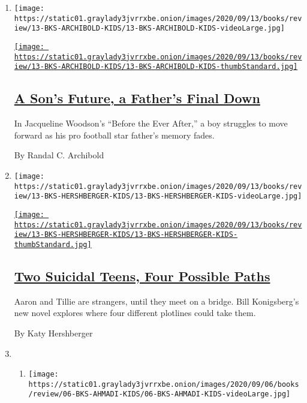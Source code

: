 \begin{enumerate}
\def\labelenumi{\arabic{enumi}.}
\item
  \texttt{[image: https://static01.graylady3jvrrxbe.onion/images/2020/09/13/books/review/13-BKS-ARCHIBOLD-KIDS/13-BKS-ARCHIBOLD-KIDS-videoLarge.jpg]}

  \href{/2020/09/05/books/review/jacqueline-woodson-before-the-ever-after.html}{\texttt{[image: https://static01.graylady3jvrrxbe.onion/images/2020/09/13/books/review/13-BKS-ARCHIBOLD-KIDS/13-BKS-ARCHIBOLD-KIDS-thumbStandard.jpg]}}

  \hypertarget{a-sons-future-a-fathers-final-down}{%
  \subsection{\texorpdfstring{\href{/2020/09/05/books/review/jacqueline-woodson-before-the-ever-after.html}{A
  Son's Future, a Father's Final
  Down}}{A Son's Future, a Father's Final Down}}\label{a-sons-future-a-fathers-final-down}}

  In Jacqueline Woodson's ``Before the Ever After,'' a boy struggles to
  move forward as his pro football star father's memory fades.

  By Randal C. Archibold
\item
  \texttt{[image: https://static01.graylady3jvrrxbe.onion/images/2020/09/13/books/review/13-BKS-HERSHBERGER-KIDS/13-BKS-HERSHBERGER-KIDS-videoLarge.jpg]}

  \href{/2020/09/05/books/review/bill-konigsberg-the-bridge.html}{\texttt{[image: https://static01.graylady3jvrrxbe.onion/images/2020/09/13/books/review/13-BKS-HERSHBERGER-KIDS/13-BKS-HERSHBERGER-KIDS-thumbStandard.jpg]}}

  \hypertarget{two-suicidal-teens-four-possible-paths}{%
  \subsection{\texorpdfstring{\href{/2020/09/05/books/review/bill-konigsberg-the-bridge.html}{Two
  Suicidal Teens, Four Possible
  Paths}}{Two Suicidal Teens, Four Possible Paths}}\label{two-suicidal-teens-four-possible-paths}}

  Aaron and Tillie are strangers, until they meet on a bridge. Bill
  Konigsberg's new novel explores where four different plotlines could
  take them.

  By Katy Hershberger
\item
  \begin{enumerate}
  \def\labelenumii{\arabic{enumii}.}
  \item
    \texttt{[image: https://static01.graylady3jvrrxbe.onion/images/2020/09/06/books/review/06-BKS-AHMADI-KIDS/06-BKS-AHMADI-KIDS-videoLarge.jpg]}


\end{enumerate}
\end{enumerate}
